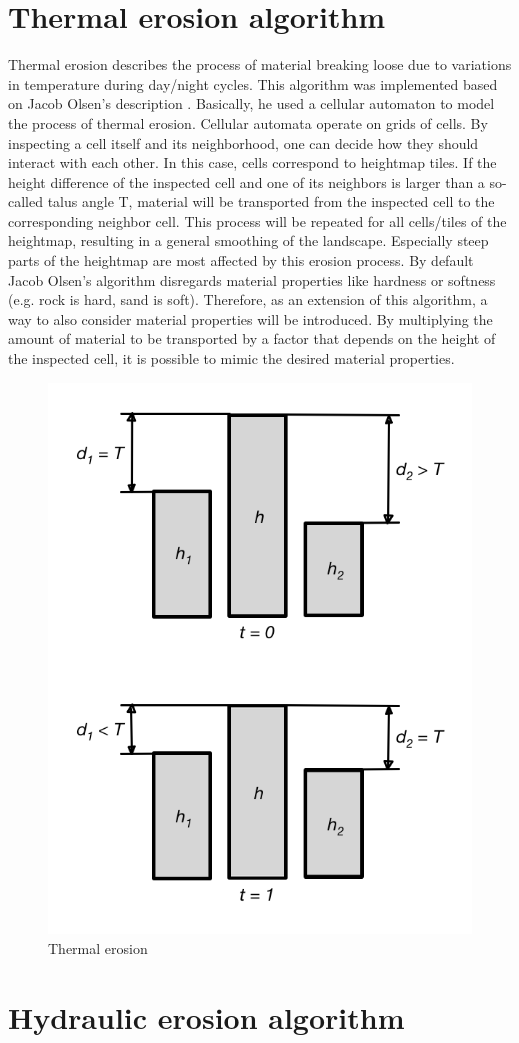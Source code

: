 \documentclass[11pt,a4paper,twoside,openright]{report}
\begin{document}
\section{Thermal erosion algorithm}
Thermal erosion describes the process of material breaking loose due to variations in temperature during day/night cycles. This algorithm was implemented based on Jacob Olsen's description \cite{Olsen:2004}. Basically, he used a cellular automaton to model the process of thermal erosion. Cellular automata operate on grids of cells. By inspecting a cell itself and its neighborhood, one can decide how they should interact with each other. In this case, cells correspond to heightmap tiles. If the height difference of the inspected cell and one of its neighbors is larger than a so-called talus angle T, material will be transported from the inspected cell to the corresponding neighbor cell. This process will be repeated for all cells/tiles of the heightmap, resulting in a general smoothing of the landscape. Especially steep parts of the heightmap are most affected by this erosion process. By default Jacob Olsen's algorithm disregards material properties like hardness or softness (e.g. rock is hard, sand is soft). Therefore, as an extension of this algorithm, a way to also consider material properties will be introduced. By multiplying the amount of material to be transported by a factor that depends on the height of the inspected cell, it is possible to mimic the desired material properties.
\begin{figure}[h]
\centering
\includegraphics[width=0.5\linewidth]{thermalerosion.png}
\caption{Thermal erosion}\label{fig:thermalerosion}
\end{figure}

\section{Hydraulic erosion algorithm}
\end{document}
